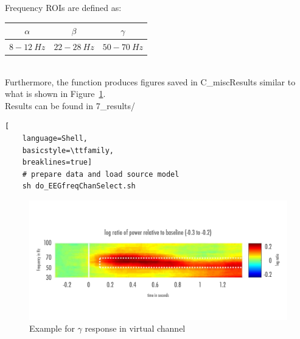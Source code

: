 \documentclass[12pt,a4paper]{scrartcl}
\begin{document}
\noindent Frequency ROIs are defined as:
\begin{table}[h]
\begin{tabular}{c | c | c}
\toprule
$\alpha$ & $\beta$ & $\gamma$\\\toprule
$8-12~Hz$ & $22-28~Hz$ & $50-70~Hz$ \\\bottomrule
\end{tabular}
\end{table}\\
Furthermore, the function produces figures saved in C\_miscResults similar to what is shown in Figure~\ref{fig:exampleGamma}.\\

\noindent Results can be found in 7\_results/\\
\begin{lstlisting}[
    language=Shell,
    basicstyle=\ttfamily,
    breaklines=true]
    # prepare data and load source model
    sh do_EEGfreqChanSelect.sh
\end{lstlisting}
\begin{figure}
\begin{center}
\includegraphics[width=1\textwidth]{exampleGamma}
\caption[Example for $\gamma$ response in virtual channel]{Example for $\gamma$ response in virtual channel}
\label{fig:exampleGamma}
\end{center}
\end{figure}
\end{document}
